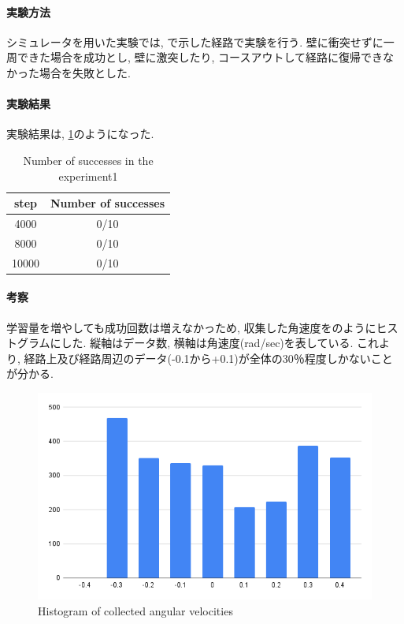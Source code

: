 \newpage
\paragraph{実験方法}
シミュレータを用いた実験では, で示した経路で実験を行う. 壁に衝突せずに一周できた場合を成功とし, 壁に激突したり, コースアウトして経路に復帰できなかった場合を失敗とした.

\paragraph{実験結果}
実験結果は, \ref{tb:exp1}のようになった.

\begin{table}[h]
  \centering
  \begin{tabular}{|c|c|} \hline
    step & Number of successes \\ \hline
    4000 & 0/10 \\ \hline
    8000 & 0/10 \\ \hline
    10000 & 0/10 \\ \hline
  \end{tabular}
  \caption{Number of successes in the experiment1}
  \label{tb:exp1}
\end{table}

\paragraph{考察}
学習量を増やしても成功回数は増えなかっため, 収集した角速度をのようにヒストグラムにした. 縦軸はデータ数, 横軸は角速度(rad/sec)を表している. これより, 経路上及び経路周辺のデータ(-0.1から+0.1)が全体の30％程度しかないことが分かる. 

\begin{figure}[h]
  \centering
  \includegraphics[keepaspectratio, scale=0.5]{images/exp1.png}
  \caption{Histogram of collected angular velocities}
  \label{Fig:exp1}
  \end{figure}

